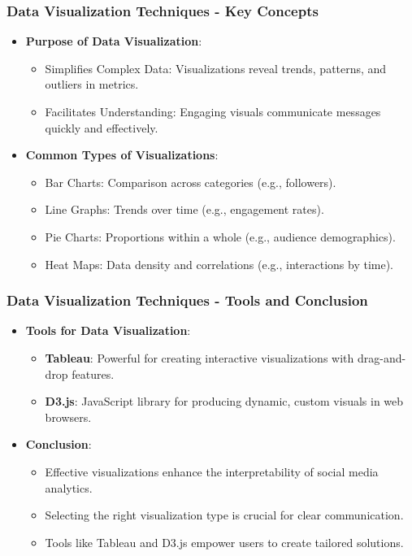\documentclass{beamer}
\begin{document}
\begin{frame}[fragile]
    \frametitle{Data Visualization Techniques - Key Concepts}
    \begin{itemize}
        \item \textbf{Purpose of Data Visualization}:
        \begin{itemize}
            \item Simplifies Complex Data: Visualizations reveal trends, patterns, and outliers in metrics.
            \item Facilitates Understanding: Engaging visuals communicate messages quickly and effectively.
        \end{itemize}
        \item \textbf{Common Types of Visualizations}:
        \begin{itemize}
            \item Bar Charts: Comparison across categories (e.g., followers).
            \item Line Graphs: Trends over time (e.g., engagement rates).
            \item Pie Charts: Proportions within a whole (e.g., audience demographics).
            \item Heat Maps: Data density and correlations (e.g., interactions by time).
        \end{itemize}
    \end{itemize}
\end{frame}

\begin{frame}[fragile]
    \frametitle{Data Visualization Techniques - Tools and Conclusion}
    \begin{itemize}
        \item \textbf{Tools for Data Visualization}:
        \begin{itemize}
            \item \textbf{Tableau}: Powerful for creating interactive visualizations with drag-and-drop features.
            \item \textbf{D3.js}: JavaScript library for producing dynamic, custom visuals in web browsers.
        \end{itemize}
        \item \textbf{Conclusion}:
        \begin{itemize}
            \item Effective visualizations enhance the interpretability of social media analytics.
            \item Selecting the right visualization type is crucial for clear communication.
            \item Tools like Tableau and D3.js empower users to create tailored solutions.
        \end{itemize}
    \end{itemize}
\end{frame}
\end{document}
